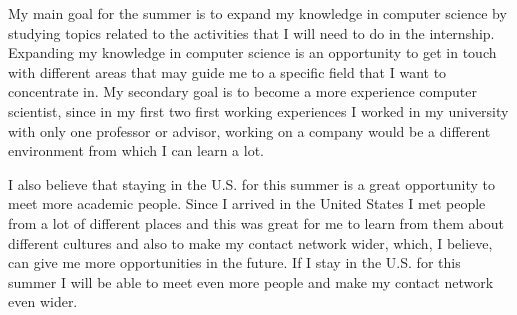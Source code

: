 \documentclass[11pt, a4paper]{awesome-cv}
\begin{document}
\begin{cvletter}
\par My main goal for the summer is to expand my knowledge in computer science by studying topics related to the activities that I will need to do in the internship. Expanding my knowledge in computer science is an opportunity to get in touch with different areas that may guide me to a specific field that I want to concentrate in. My secondary goal is to become a more experience computer scientist, since in my first two first working experiences I worked in my university with only one professor or advisor, working on a company would be a different environment from which I can learn a lot.

\par I also believe that staying in the U.S. for this summer is a great opportunity to meet more academic people. Since I arrived in the United States I met people from a lot of different places and this was great for me to learn from them about different cultures and also to make my contact network wider, which, I believe, can give me more opportunities in the future. If I stay in the U.S. for this summer I will be able to meet even more people and make my contact network even wider.

\end{cvletter}


\end{document}
